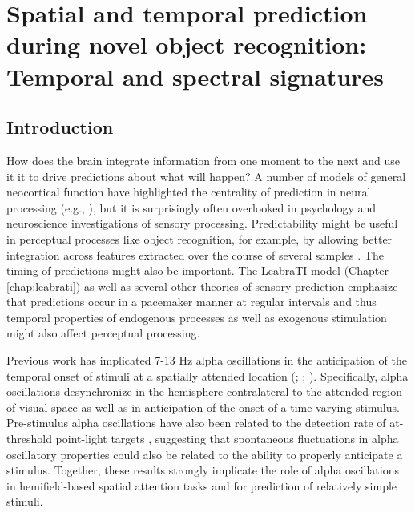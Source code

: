\documentclass[dwyatte_dissertation.tex]{subfiles}
\begin{document}
\sloppy

\chapter{Spatial and temporal prediction during novel object recognition: Temporal and spectral signatures}
\label{chap:pleast}

\section{Introduction}
How does the brain integrate information from one moment to the next and use it it to drive predictions about what will happen? A number of models of general neocortical function have highlighted the centrality of prediction in neural processing (e.g., ), but it is surprisingly often overlooked in psychology and neuroscience investigations of sensory processing. Predictability might be useful in perceptual processes like object recognition, for example, by allowing better integration across features extracted over the course of several samples \cite{Foldiak91,StringerPerryRollsEtAl06,WallisBaddeley97,IsikLeiboPoggio12}. The timing of predictions might also be important. The LeabraTI model (Chapter \ref{chap:leabrati}) as well as several other theories of sensory prediction \cite{ArnalGiraud12,GiraudPoeppel12} emphasize that predictions occur in a pacemaker manner at regular intervals and thus temporal properties of endogenous processes as well as exogenous stimulation might also affect perceptual processing.

Previous work has implicated 7-13 Hz alpha oscillations in the anticipation of the temporal onset of stimuli at a spatially attended location (; ; ). Specifically, alpha oscillations desynchronize in the hemisphere contralateral to the attended region of visual space as well as in anticipation of the onset of a time-varying stimulus. Pre-stimulus alpha oscillations have also been related to the detection rate of at-threshold point-light targets \cite{MathewsonGrattonFabianiEtAl09,BuschDuboisVanRullen09}, suggesting that spontaneous fluctuations in alpha oscillatory properties could also be related to the ability to properly anticipate a stimulus. Together, these results strongly implicate the role of alpha oscillations in hemifield-based spatial attention tasks and for prediction of relatively simple stimuli. 
\end{document}

